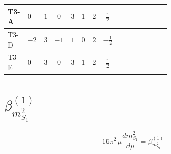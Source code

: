 \documentclass[8pt]{article}
\begin{document}
\begin{landscape}
\begin{longtable}{@{}llcccccc >{\raggedright\arraybackslash}p{0.21\linewidth} >{\raggedright\arraybackslash}p{0.21\linewidth} >{\raggedright\arraybackslash}p{0.21\linewidth}@{}}
\midrule
T3-A & $0$ & $1$ & $0$ & $3$ & $1$ & $2$ & $\frac{1}{2}$ & \scriptsize\adjustbox{max width=\linewidth}{$\begin{gathered} +\frac{3}{2} \left({Y_e}\,\left({Y_e}\right)^{\dagger}\,{Y_e}\right)_{ij}\end{gathered}$} & \scriptsize\adjustbox{max width=\linewidth}{$\begin{gathered} -\frac{9}{4} {g_2}^2 \left({Y_e}\right)_{ij}\end{gathered}$} & \scriptsize\adjustbox{max width=\linewidth}{$\begin{gathered} -\frac{15}{4} {g_Y}^2 \left({Y_e}\right)_{ij}\end{gathered}$} \\
\midrule
T3-D & $-2$ & $3$ & $-1$ & $1$ & $0$ & $2$ & $-\frac{1}{2}$ & \scriptsize\adjustbox{max width=\linewidth}{$\begin{gathered} +\frac{3}{2} \left({Y_e}\,\left({Y_e}\right)^{\dagger}\,{Y_e}\right)_{ij}\end{gathered}$} & \scriptsize\adjustbox{max width=\linewidth}{$\begin{gathered} -\frac{9}{4} {g_2}^2 \left({Y_e}\right)_{ij}\end{gathered}$} & \scriptsize\adjustbox{max width=\linewidth}{$\begin{gathered} -\frac{15}{4} {g_Y}^2 \left({Y_e}\right)_{ij}\end{gathered}$} \\
\midrule
T3-E & $0$ & $3$ & $0$ & $3$ & $1$ & $2$ & $\frac{1}{2}$ & \scriptsize\adjustbox{max width=\linewidth}{$\begin{gathered} +\frac{3}{2} \left({Y_e}\,\left({Y_e}\right)^{\dagger}\,{Y_e}\right)_{ij}\end{gathered}$} & \scriptsize\adjustbox{max width=\linewidth}{$\begin{gathered} -\frac{9}{4} {g_2}^2 \left({Y_e}\right)_{ij}\end{gathered}$} & \scriptsize\adjustbox{max width=\linewidth}{$\begin{gathered} -\frac{15}{4} {g_Y}^2 \left({Y_e}\right)_{ij}\end{gathered}$} \\
\midrule
\bottomrule
\end{longtable}
\clearpage
\section*{$\beta_{m_{S_1}^2}^{(1)}$}
\[16\pi^2\,\mu\frac{d m_{S_1}^2}{d\mu}=\beta_{m_{S_1}^2}^{(1)}\]

\end{landscape}
\end{document}
